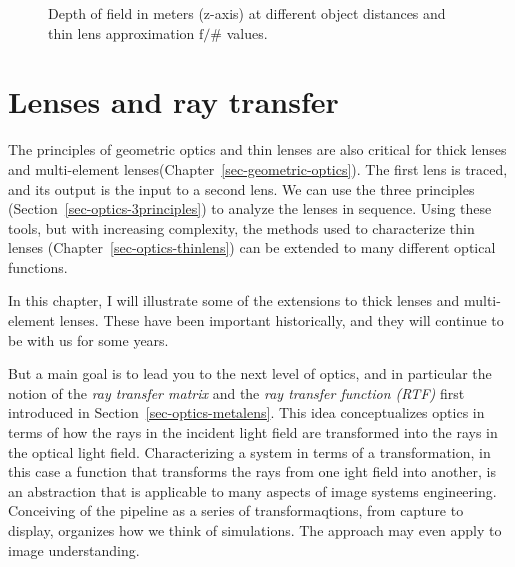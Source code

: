 \documentclass[
  letterpaper,
]{book}
\begin{document}
\begin{figure}


\caption{\label{fig-optics-dof}Depth of field in meters (z-axis) at
different object distances and thin lens approximation \(\mathrm{f}/\#\)
values.}

\end{figure}%

\chapter{Lenses and ray transfer}\label{sec-optics-morelenses}

The principles of geometric optics and thin lenses are also critical for
thick lenses and multi-element
lenses(Chapter~\ref{sec-geometric-optics}). The first lens is traced,
and its output is the input to a second lens. We can use the three
principles (Section~\ref{sec-optics-3principles}) to analyze the lenses
in sequence. Using these tools, but with increasing complexity, the
methods used to characterize thin lenses
(Chapter~\ref{sec-optics-thinlens}) can be extended to many different
optical functions.

In this chapter, I will illustrate some of the extensions to thick
lenses and multi-element lenses. These have been important historically,
and they will continue to be with us for some years.

But a main goal is to lead you to the next level of optics, and in
particular the notion of the \emph{ray transfer matrix} and the
\emph{ray transfer function (RTF)} first introduced in
Section~\ref{sec-optics-metalens}. This idea conceptualizes optics in
terms of how the rays in the incident light field are transformed into
the rays in the optical light field. Characterizing a system in terms of
a transformation, in this case a function that transforms the rays from
one ight field into another, is an abstraction that is applicable to
many aspects of image systems engineering. Conceiving of the pipeline as
a series of transformaqtions, from capture to display, organizes how we
think of simulations. The approach may even apply to image
understanding.
\end{document}
